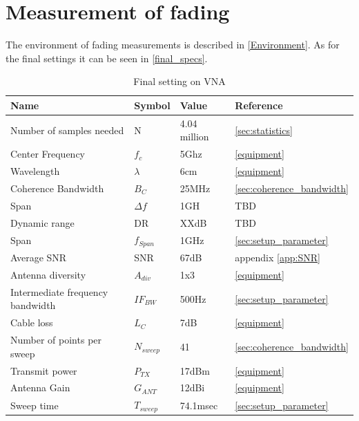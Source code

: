 \chapter{Measurement of fading}
The environment of fading measurements is described in \autoref{Environment}. As for the final settings it can be seen in \autoref{final_specs}.
\begin{table}[H]
\centering
\begin{tabular}{|l|l|l|l|}
\hline
\textbf{Name}					& \textbf{Symbol} & \textbf{Value} 	& \textbf{Reference} 		\\ \hline
Number of samples needed        & N           	& 4.04 million      & \autoref{sec:statistics}	\\ \hline
Center Frequency                & $f_c$       	& 5Ghz              & \autoref{equipment}		\\ \hline
Wavelength                      & $\lambda$   	& 6cm           	& \autoref{equipment}		\\ \hline
Coherence Bandwidth             & $B_C$		  	& 25MHz   			& \autoref{sec:coherence_bandwidth} \\ \hline
Span 							& $\Delta f$ 	& 1GH 				& TBD \\ \hline
Dynamic range                   & DR          	& XXdB            	& TBD \\ \hline
Span 							& $f_{Span}$ 	& 1GHz 				& \autoref{sec:setup_parameter} \\ \hline
Average SNR	                   	& SNR          	& 67dB            	& appendix  \ref{app:SNR} 	\\ \hline
Antenna diversity               & $A_{div}$   	& 1x3    			& \autoref{equipment} 		\\ \hline
Intermediate frequency bandwidth & $IF_{BW}$    & 500Hz   			& \autoref{sec:setup_parameter} \\ \hline
Cable loss 						& $L_{C}$     	& 7dB         		& \autoref{equipment} 		\\ \hline
Number of points per sweep 		& $N_{sweep}$ 	& 41				& \autoref{sec:coherence_bandwidth} \\ \hline
Transmit power 					& $P_{TX}$ 		& 17dBm				& \autoref{equipment} 		\\ \hline
Antenna Gain 					& $G_{ANT}$ 	& 12dBi 			& \autoref{equipment} \\ \hline
Sweep time 						& $T_{sweep}$ 	& 74.1msec			& \autoref{sec:setup_parameter} \\ \hline
\end{tabular}
\caption{Final setting on VNA}
\label{final_specs}
\end{table}

